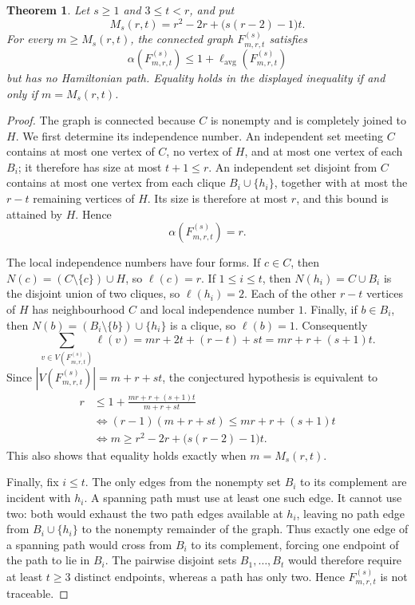 \documentclass[11pt]{article}
\newtheorem{theorem}{Theorem}
\newcommand{\lavg}{\ell_{\mathrm{avg}}}
\begin{document}
\begin{theorem}\label{thm:family}
Let $s\geq 1$ and $3\leq t<r$, and put
\[
  M_s(r,t)=r^2-2r+\bigl(s(r-2)-1\bigr)t.
\]
For every $m\geq M_s(r,t)$, the connected graph $F^{(s)}_{m,r,t}$ satisfies
\[
  \alpha(F^{(s)}_{m,r,t})\leq 1+\lavg(F^{(s)}_{m,r,t})
\]
but has no Hamiltonian path.  Equality holds in the displayed inequality if and only if
$m=M_s(r,t)$.
\end{theorem}

\begin{proof}
The graph is connected because $C$ is nonempty and is completely joined to $H$.
We first determine its independence number.  An independent set meeting $C$ contains
at most one vertex of $C$, no vertex of $H$, and at most one vertex of each $B_i$; it
therefore has size at most $t+1\leq r$.  An independent set disjoint from $C$ contains at
most one vertex from each clique $B_i\cup\{h_i\}$, together with at most the $r-t$
remaining vertices of $H$.  Its size is therefore at most $r$, and this bound is attained
by $H$.  Hence
\[
  \alpha(F^{(s)}_{m,r,t})=r.
\]

The local independence numbers have four forms.  If $c\in C$, then
$N(c)=(C\setminus\{c\})\cup H$, so $\ell(c)=r$.  If $1\leq i\leq t$, then
$N(h_i)=C\cup B_i$ is the disjoint union of two cliques, so $\ell(h_i)=2$.  Each of the
other $r-t$ vertices of $H$ has neighbourhood $C$ and local independence number $1$.
Finally, if $b\in B_i$, then $N(b)=(B_i\setminus\{b\})\cup\{h_i\}$ is a clique, so
$\ell(b)=1$.  Consequently
\begin{equation}\label{eq:localsum}
  \sum_{v\in V(F^{(s)}_{m,r,t})}\ell(v)
  =mr+2t+(r-t)+st
  =mr+r+(s+1)t.
\end{equation}
Since $|V(F^{(s)}_{m,r,t})|=m+r+st$, the conjectured hypothesis is equivalent to
\begin{align*}
  r
  &\leq 1+\frac{mr+r+(s+1)t}{m+r+st}\\
  &\Longleftrightarrow
  (r-1)(m+r+st)\leq mr+r+(s+1)t\\
  &\Longleftrightarrow
  m\geq r^2-2r+\bigl(s(r-2)-1\bigr)t.
\end{align*}
This also shows that equality holds exactly when $m=M_s(r,t)$.

Finally, fix $i\leq t$.  The only edges from the nonempty set $B_i$ to its complement are
incident with $h_i$.  A spanning path must use at least one such edge.  It cannot use two:
both would exhaust the two path edges available at $h_i$, leaving no path edge from
$B_i\cup\{h_i\}$ to the nonempty remainder of the graph.  Thus exactly one edge of a
spanning path would cross from $B_i$ to its complement, forcing one endpoint of the path
to lie in $B_i$.  The pairwise disjoint sets $B_1,\dots,B_t$ would therefore require at
least $t\geq 3$ distinct endpoints, whereas a path has only two.  Hence
$F^{(s)}_{m,r,t}$ is not traceable.
\end{proof}
\end{document}
